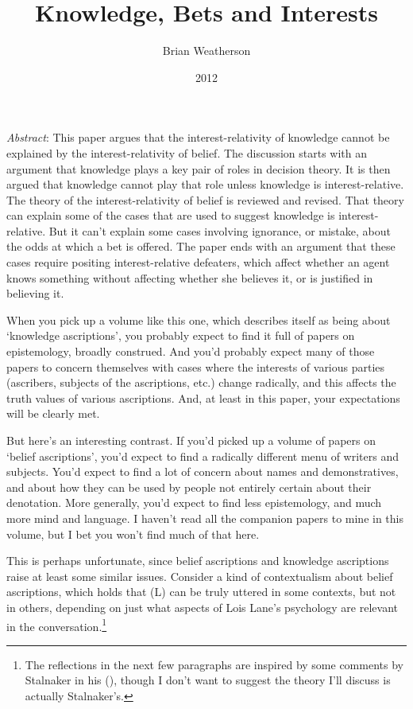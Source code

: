 \documentclass[
  11pt,
  letterpaper,
  DIV=11,
  numbers=noendperiod,
  twoside]{scrartcl}
\title{Knowledge, Bets and Interests}
\author{Brian Weatherson}
\date{2012}
\renewenvironment{abstract}
 {\vspace{-1.25cm}
 \quotation\small\noindent\emph{Abstract}:}
 {\endquotation}
\renewenvironment{abstract}
 {\quotation\small\noindent\emph{Abstract}:}
 {\endquotation\vspace{-0.02cm}}
\begin{document}
\maketitle
\begin{abstract}
This paper argues that the interest-relativity of knowledge cannot be
explained by the interest-relativity of belief. The discussion starts
with an argument that knowledge plays a key pair of roles in decision
theory. It is then argued that knowledge cannot play that role unless
knowledge is interest-relative. The theory of the interest-relativity of
belief is reviewed and revised. That theory can explain some of the
cases that are used to suggest knowledge is interest-relative. But it
can't explain some cases involving ignorance, or mistake, about the odds
at which a bet is offered. The paper ends with an argument that these
cases require positing interest-relative defeaters, which affect whether
an agent knows something without affecting whether she believes it, or
is justified in believing it.
\end{abstract}


When you pick up a volume like this one, which describes itself as being
about `knowledge ascriptions', you probably expect to find it full of
papers on epistemology, broadly construed. And you'd probably expect
many of those papers to concern themselves with cases where the
interests of various parties (ascribers, subjects of the ascriptions,
etc.) change radically, and this affects the truth values of various
ascriptions. And, at least in this paper, your expectations will be
clearly met.

But here's an interesting contrast. If you'd picked up a volume of
papers on `belief ascriptions', you'd expect to find a radically
different menu of writers and subjects. You'd expect to find a lot of
concern about names and demonstratives, and about how they can be used
by people not entirely certain about their denotation. More generally,
you'd expect to find less epistemology, and much more mind and language.
I haven't read all the companion papers to mine in this volume, but I
bet you won't find much of that here.

This is perhaps unfortunate, since belief ascriptions and knowledge
ascriptions raise at least some similar issues. Consider a kind of
contextualism about belief ascriptions, which holds that (L) can be
truly uttered in some contexts, but not in others, depending on just
what aspects of Lois Lane's psychology are relevant in the
conversation.\footnote{The reflections in the next few paragraphs are
  inspired by some comments by Stalnaker in his
  (), though I don't want to suggest
  the theory I'll discuss is actually Stalnaker's.}
\end{document}
